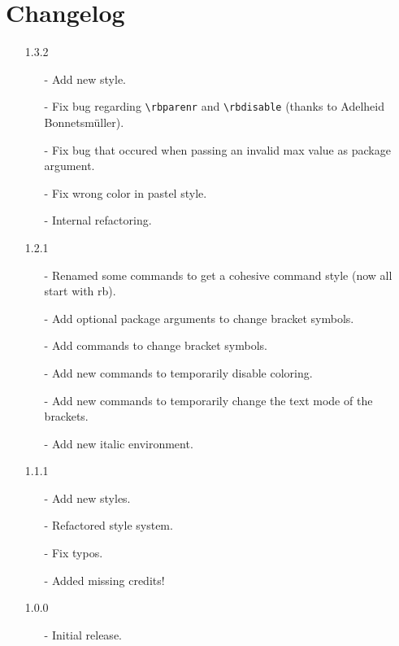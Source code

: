\documentclass[10pt, a4paper]{article}
\begin{document}
	\section{Changelog}
	\begin{itemize}
		\item[1.3.2] 
		\begin{enumerate}
			\item[-] Add new style.
			\item[-] Fix bug regarding \verb=\rbparenr= and \verb=\rbdisable= (thanks to Adelheid Bonnetsmüller).
			\item[-] Fix bug that occured when passing an invalid max value as package argument.
			\item[-] Fix wrong color in pastel style.
			\item[-] Internal refactoring.
		\end{enumerate}
		\item[1.2.1] 
		\begin{enumerate}
			\item[-] Renamed some commands to get a cohesive command style (now all start with rb).
			\item[-] Add optional package arguments to change bracket symbols.
			\item[-] Add commands to change bracket symbols.
			\item[-] Add new commands to temporarily disable coloring.
			\item[-] Add new commands to temporarily change the text mode of the brackets.
			\item[-] Add new italic environment.
		\end{enumerate}
		\item[1.1.1] 
		\begin{enumerate}
			\item[-] Add new styles.
			\item[-] Refactored style system.
			\item[-] Fix typos.
			\item[-] Added missing credits!
		\end{enumerate}
		\item[1.0.0] 
		\begin{enumerate}
			\item[-] Initial release.
		\end{enumerate}
	\end{itemize}
\end{document}
